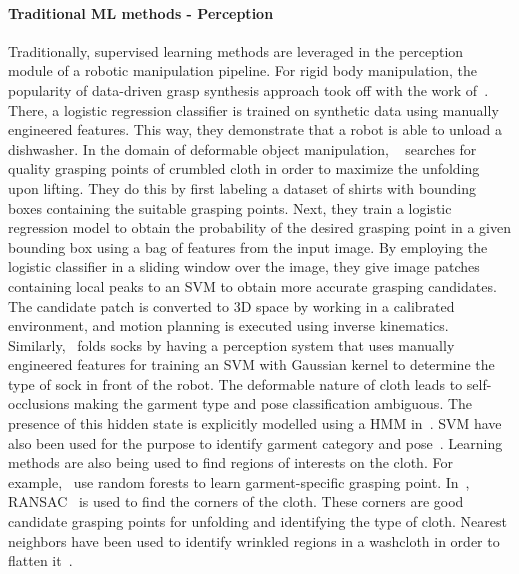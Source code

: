 \documentclass[\home/main.tex]{subfiles}
\begin{document}
\paragraph{Traditional ML methods - Perception}
Traditionally, supervised learning methods are leveraged in the perception module of a robotic manipulation pipeline. For rigid body manipulation, the popularity of data-driven grasp synthesis approach took off with the work of~\textcite{Saxena2008}. There, a logistic regression classifier is trained on synthetic data using manually engineered features. This way, they demonstrate that a robot is able to unload a dishwasher. In the domain of deformable object manipulation, ~\textcite{Ramisa2012} searches for quality grasping points of crumbled cloth in order to maximize the unfolding upon lifting. They do this by first labeling a dataset of shirts with bounding boxes containing the suitable grasping points. Next, they train a logistic regression model to obtain the probability of the desired grasping point in a given bounding box using a bag of features from the input image. By employing the logistic classifier in a sliding window over the image, they give image patches containing local peaks to an \gls{SVM} to obtain more accurate grasping candidates. The candidate patch is converted to 3D space by working in a calibrated environment, and motion planning is executed using inverse kinematics. Similarly,~\textcite{Wang2011} folds socks by having a perception system that uses manually engineered features for training an \gls{SVM} with Gaussian kernel to determine the type of sock in front of the robot. The deformable nature of cloth leads to self-occlusions making the garment type and pose classification ambiguous. The presence of this hidden state is explicitly modelled using a \gls{HMM} in~\autocite{Cusumano2011}. \gls{SVM} have also been used for the purpose to identify garment category and pose~\autocite{Li2014, li2014volum}. Learning methods are also being used to find regions of interests on the cloth. For example,~\textcite{Doumanoglou2016} use random forests to learn garment-specific grasping point. In~\autocite{Maitin2010}, RANSAC~\autocite{RANSAC} is used to find the corners of the cloth. These corners are good candidate grasping points for unfolding and identifying the type of cloth. Nearest neighbors have been used to identify wrinkled regions in a washcloth in order to flatten it~\autocite{Willimon2011}.
\end{document}
